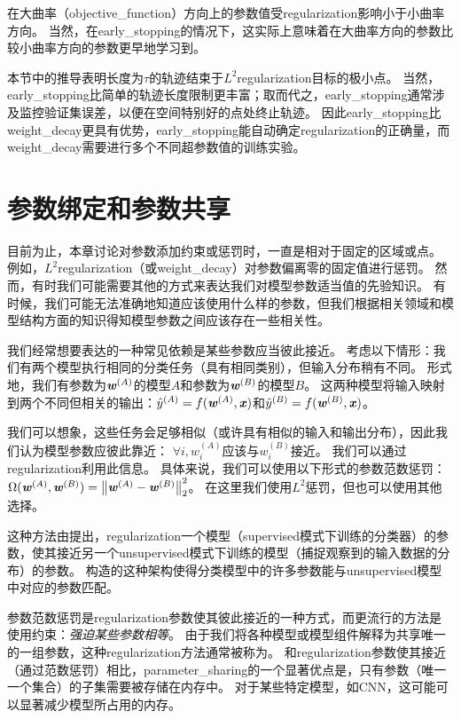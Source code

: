 在大曲率（\gls{objective_function}）方向上的参数值受\gls{regularization}影响小于小曲率方向。
当然，在\gls{early_stopping}的情况下，这实际上意味着在大曲率方向的参数比较小曲率方向的参数更早地学习到。
 
本节中的推导表明长度为$\tau$的轨迹结束于$L^2$\gls{regularization}目标的极小点。
当然，\gls{early_stopping}比简单的轨迹长度限制更丰富；取而代之，\gls{early_stopping}通常涉及监控验证集误差，以便在空间特别好的点处终止轨迹。
因此\gls{early_stopping}比\gls{weight_decay}更具有优势，\gls{early_stopping}能自动确定\gls{regularization}的正确量，而\gls{weight_decay}需要进行多个不同超参数值的训练实验。


\section{参数绑定和参数共享}
\label{sec:parameter_tying_and_parameter_sharing}
目前为止，本章讨论对参数添加约束或惩罚时，一直是相对于固定的区域或点。
例如，$L^2$\gls{regularization}（或\gls{weight_decay}）对参数偏离零的固定值进行惩罚。
然而，有时我们可能需要其他的方式来表达我们对模型参数适当值的先验知识。
有时候，我们可能无法准确地知道应该使用什么样的参数，但我们根据相关领域和模型结构方面的知识得知模型参数之间应该存在一些相关性。

我们经常想要表达的一种常见依赖是某些参数应当彼此接近。
考虑以下情形：我们有两个模型执行相同的分类任务（具有相同类别），但输入分布稍有不同。
形式地，我们有参数为$\boldsymbol{\mathit{w}}^{(A)}$的模型$A$和参数为$\boldsymbol{\mathit{w}}^{(B)}$的模型$B$。
这两种模型将输入映射到两个不同但相关的输出：$\hat y^{(A)} = f(\boldsymbol{\mathit{w}}^{(A)}, \boldsymbol{\mathit{x}})$和$\hat y^{(B)} = f(\boldsymbol{\mathit{w}}^{(B)}, \boldsymbol{\mathit{x}})$。

我们可以想象，这些任务会足够相似（或许具有相似的输入和输出分布），因此我们认为模型参数应彼此靠近：
$\forall i, w_i^{(A)}$应该与$ w_i^{(B)}$接近。
我们可以通过\gls{regularization}利用此信息。
具体来说，我们可以使用以下形式的参数范数惩罚：
$\Omega(\boldsymbol{\mathit{w}}^{(A)}, \boldsymbol{\mathit{w}}^{(B)}) = \left\lVert\boldsymbol{\mathit{w}}^{(A)}-\boldsymbol{\mathit{w}}^{(B)}\right\rVert_2^2$。
在这里我们使用$L^2$惩罚，但也可以使用其他选择。

这种方法由\cite{LasserreJ2006}提出，\gls{regularization}一个模型（\gls{supervised}模式下训练的分类器）的参数，使其接近另一个\gls{unsupervised}模式下训练的模型（捕捉观察到的输入数据的分布）的参数。
构造的这种架构使得分类模型中的许多参数能与\gls{unsupervised}模型中对应的参数匹配。

参数范数惩罚是\gls{regularization}参数使其彼此接近的一种方式，而更流行的方法是使用约束：\emph{强迫某些参数相等}。
由于我们将各种模型或模型组件解释为共享唯一的一组参数，这种\gls{regularization}方法通常被称为。
和\gls{regularization}参数使其接近（通过范数惩罚）相比，\gls{parameter_sharing}的一个显著优点是，只有参数（唯一一个集合）的子集需要被存储在内存中。
对于某些特定模型，如\gls{CNN}，这可能可以显著减少模型所占用的内存。


